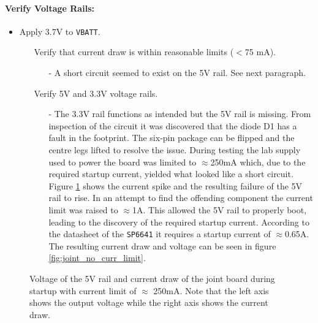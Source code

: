 \paragraph{Verify Voltage Rails:} %
 \label{par:verify_voltage_rails}
 \begin{itemize}
 	\item Apply 3.7V to \texttt{VBATT}.
 	\begin{itemize}
 		\item[\xmark] Verify that current draw is within reasonable limits ($<$75 mA).
 		\begin{itemize}
 			\item[-] A short circuit seemed to exist on the 5V rail.
 			See next paragraph.
 		\end{itemize}
 		\item[\xmark] Verify 5V and 3.3V voltage rails.
 		\begin{itemize}
 			\item[-] The 3.3V rail functions as intended but the 5V rail is missing.
 			From inspection of the circuit it was discovered that the diode D1 has a fault in the footprint.
 			The six-pin package can be flipped and the centre legs lifted to resolve the issue.
 			During testing the lab supply used to power the board was limited to $\approx$250mA which, due to the required startup current, yielded what looked like a short circuit.
 			Figure \ref{fig:joint_curr_limit} shows the current spike and the resulting failure of the 5V rail to rise.
 			In an attempt to find the offending component the current limit was raised to $\approx$1A.
 			This allowed the 5V rail to properly boot, leading to the discovery of the required startup current.
 			According to the datasheet of the \texttt{SP6641} \cite{sp6641b} it requires a startup current of $\approx$0.65A. 
 			The resulting current draw and voltage can be seen in figure \ref{fig:joint_no_curr_limit}.
 		\end{itemize}
 	\end{itemize}
 \end{itemize}
 
\begin{figure}[h]
	\centering
	
	\caption[Voltages and current of 5V converter with current limit]{Voltage of the 5V rail and current draw of the joint board during startup with current limit of $\approx$ 250mA. Note that the left axis shows the output voltage while the right axis shows the current draw.}
	\label{fig:joint_curr_limit}
\end{figure}

